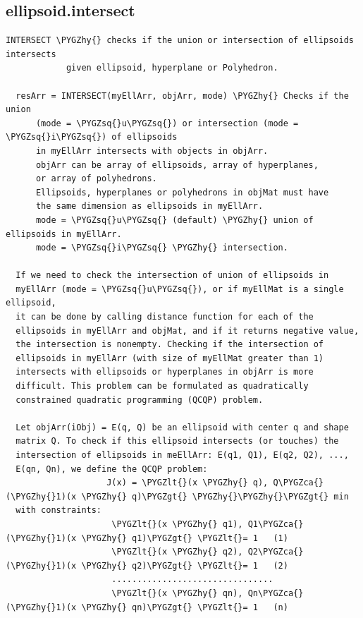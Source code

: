 \documentclass[letterpaper,10pt,english]{sphinxmanual}
\def\PYGZca{\char`\^}
\def\PYGZlt{\char`\<}
\def\PYGZgt{\char`\>}
\def\PYGZhy{\char`\-}
\def\PYGZsq{\char`\'}
\begin{document}
\subsection{ellipsoid.intersect}
\label{chap_functions:ellipsoid-intersect}
\begin{Verbatim}[commandchars=\\\{\}]
INTERSECT \PYGZhy{} checks if the union or intersection of ellipsoids intersects
            given ellipsoid, hyperplane or Polyhedron.

  resArr = INTERSECT(myEllArr, objArr, mode) \PYGZhy{} Checks if the union
      (mode = \PYGZsq{}u\PYGZsq{}) or intersection (mode = \PYGZsq{}i\PYGZsq{}) of ellipsoids
      in myEllArr intersects with objects in objArr.
      objArr can be array of ellipsoids, array of hyperplanes,
      or array of polyhedrons.
      Ellipsoids, hyperplanes or polyhedrons in objMat must have
      the same dimension as ellipsoids in myEllArr.
      mode = \PYGZsq{}u\PYGZsq{} (default) \PYGZhy{} union of ellipsoids in myEllArr.
      mode = \PYGZsq{}i\PYGZsq{} \PYGZhy{} intersection.

  If we need to check the intersection of union of ellipsoids in
  myEllArr (mode = \PYGZsq{}u\PYGZsq{}), or if myEllMat is a single ellipsoid,
  it can be done by calling distance function for each of the
  ellipsoids in myEllArr and objMat, and if it returns negative value,
  the intersection is nonempty. Checking if the intersection of
  ellipsoids in myEllArr (with size of myEllMat greater than 1)
  intersects with ellipsoids or hyperplanes in objArr is more
  difficult. This problem can be formulated as quadratically
  constrained quadratic programming (QCQP) problem.

  Let objArr(iObj) = E(q, Q) be an ellipsoid with center q and shape
  matrix Q. To check if this ellipsoid intersects (or touches) the
  intersection of ellipsoids in meEllArr: E(q1, Q1), E(q2, Q2), ...,
  E(qn, Qn), we define the QCQP problem:
                    J(x) = \PYGZlt{}(x \PYGZhy{} q), Q\PYGZca{}(\PYGZhy{}1)(x \PYGZhy{} q)\PYGZgt{} \PYGZhy{}\PYGZhy{}\PYGZgt{} min
  with constraints:
                     \PYGZlt{}(x \PYGZhy{} q1), Q1\PYGZca{}(\PYGZhy{}1)(x \PYGZhy{} q1)\PYGZgt{} \PYGZlt{}= 1   (1)
                     \PYGZlt{}(x \PYGZhy{} q2), Q2\PYGZca{}(\PYGZhy{}1)(x \PYGZhy{} q2)\PYGZgt{} \PYGZlt{}= 1   (2)
                     ................................
                     \PYGZlt{}(x \PYGZhy{} qn), Qn\PYGZca{}(\PYGZhy{}1)(x \PYGZhy{} qn)\PYGZgt{} \PYGZlt{}= 1   (n)


\end{Verbatim}
\end{document}
